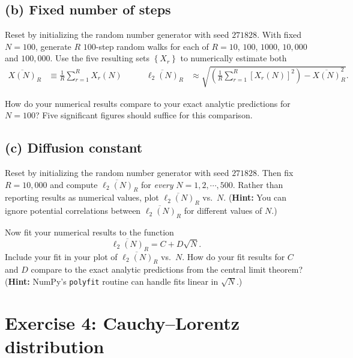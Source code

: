 \documentclass[12 pt]{article} %
\newcommand{\showmarks}[1]{\rightline{\texttt{[#1 marks]}}} %
\begin{document}
\showmarks{2}

\subsection*{(b) Fixed number of steps}
Reset by initializing the random number generator with seed $271828$.
With fixed $N = 100$, generate $R$ $100$-step random walks for each of $R = 10$, $100$, $1000$, $10{,}000$ and $100{,}000$.
Use the five resulting sets $\left\{X_r\right\}$ to numerically estimate both
\begin{align*}
  \overline{X(N)}_R & \equiv \frac{1}{R} \sum_{r = 1}^R X_r(N) \qquad &
  \overline{\ell_2(N)}_R & \approx \sqrt{\left(\frac{1}{R} \sum_{r = 1}^R \left[X_r(N)\right]^2\right) - \overline{X(N)}_R^2}.
\end{align*}

How do your numerical results compare to your exact analytic predictions for $N = 100$?
Five significant figures should suffice for this comparison.

\showmarks{8}

\subsection*{(c) Diffusion constant}
Reset by initializing the random number generator with seed $271828$.
Then fix $R = 10{,}000$ and compute $\overline{\ell_2(N)}_R$ for \textit{every} $N = 1, 2, \cdots, 500$.
Rather than reporting results as numerical values, plot $\overline{\ell_2(N)}_R$ vs.\ $N$.
(\textbf{Hint:} You can ignore potential correlations between $\overline{\ell_2(N)}_R$ for different values of $N$.)

\showmarks{4}

Now fit your numerical results to the function
\begin{equation*}
  \overline{\ell_2(N)}_R = C + D \sqrt{N}.
\end{equation*}
Include your fit in your plot of $\overline{\ell_2(N)}_R$ vs.\ $N$.
How do your fit results for $C$ and $D$ compare to the exact analytic predictions from the central limit theorem?
(\textbf{Hint:} NumPy's \texttt{polyfit} routine can handle fits linear in $\sqrt{N}$.)

\showmarks{6}



\section*{Exercise 4: Cauchy--Lorentz distribution}
\end{document}
